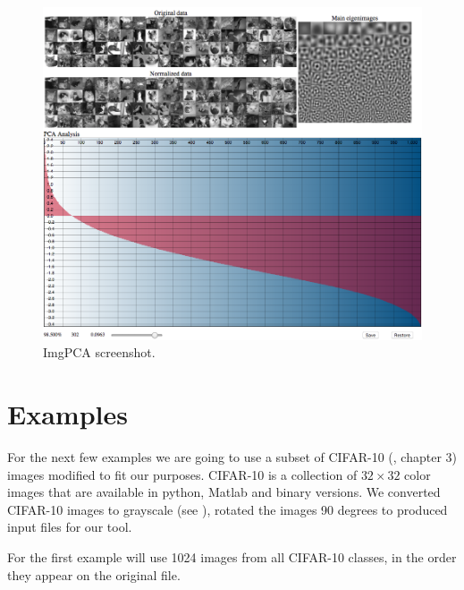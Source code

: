\documentclass{article} %
\begin{document}

\begin{figure}[h]
\begin{center}
\includegraphics[width=\textwidth]{imgPca.png}
\end{center}
\caption{ImgPCA screenshot.}
\end{figure}
\section{Examples}
For the next few examples we are going to use a subset of CIFAR-10 (\citet{krizhevsky2009learning}, chapter 3) images modified to fit our purposes. CIFAR-10 is a collection of $32\times 32$ color images that are available in python, Matlab and binary versions. We converted CIFAR-10 images to grayscale (see ), rotated the images 90 degrees to produced input files for our tool.\par

For the first example will use 1024 images from all CIFAR-10 classes, in the order they appear on the original file.\par
\end{document}
